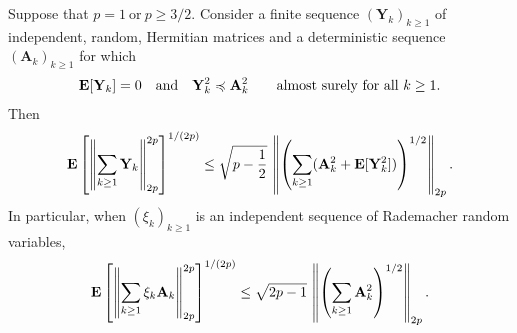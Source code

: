 \begin{ftheorem}
  \emph{\cite[Corollary~7.3]{Mackey2014}}
  Suppose that
  $
    p = 1
    \ 
    \text{or}\ 
    p \ge 3/2
    .
  $
  Consider a finite sequence
  $
    (\mathbf{Y}_k)_{k\ge 1}
  $
  of independent, random, Hermitian matrices 
  and a deterministic sequence
  $
    (\mathbf{A}_k)_{k\ge 1}
  $
  for which
  \begin{gather}
    \E[\mathbf{Y}_k]
    =
    0
    \quad 
    \text{and}
    \quad
    \mathbf{Y}_k^2
    \preccurlyeq
    \mathbf{A}_k^2
    \qquad
    \text{almost surely for all}\ 
    k \ge 1.
  \end{gather}
  Then
  \begin{gather}
      \mathbf{E}
      \left[
        \left\lVert
          \sum_{k\ge 1}
            \mathbf{Y}_k
        \right\rVert
        _{2p}
        ^{2p}
      \right]
      ^{1/(2p)}
      \le
      \sqrt{
        p - \frac{1}{2}
      }
      \,
      \left\lVert
        \left( 
          \sum_{k\ge 1}
          (
            \mathbf{A}_k^2
            + 
            \mathbf{E}[
              \mathbf{Y}_k^2
            ]
          )
        \right)
        ^{1/2}
        \right\rVert
      _{2p}
      .
  \end{gather}
  In particular, when 
  $
    (\xi_k)_{k\ge 1}
  $
  is an independent sequence of Rademacher random variables,
  \begin{gather}
      \mathbf{E}
      \left[
        \left\lVert
          \sum_{k\ge 1}
            \xi_k
            \mathbf{A}_k
        \right\rVert
        _{2p}
        ^{2p}
      \right]
      ^{1/(2p)}
      \le
      \sqrt{
        2p - 1
        }
      \,
      \left\lVert
        \left( 
          \sum_{k\ge 1}
            \mathbf{A}_k^2
        \right)
        ^{1/2}
        \right\rVert
      _{2p}
      .
  \end{gather}
\end{ftheorem}
